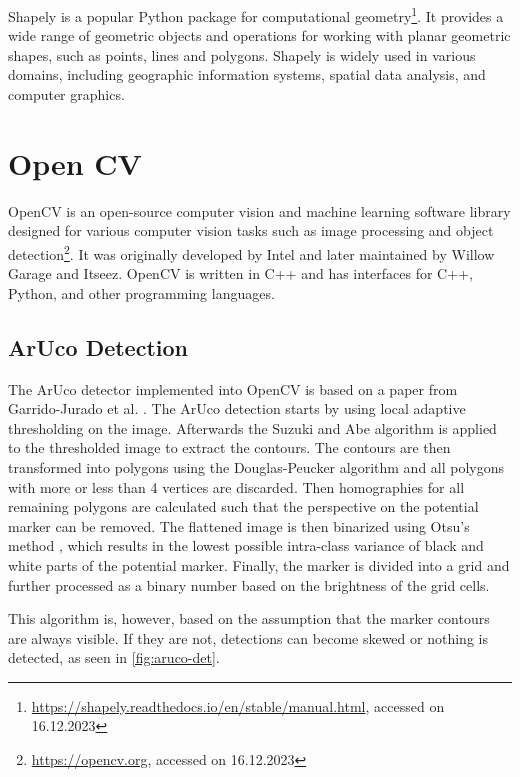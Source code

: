 \documentclass[10pt]{book}
\newcommand{\figureref}[1]{\autoref{#1}}
\begin{document}
Shapely is a popular Python package for computational geometry\footnote{\url{https://shapely.readthedocs.io/en/stable/manual.html}, accessed on 16.12.2023}. It provides a wide range of geometric objects and operations for working with planar geometric shapes, such as points, lines and polygons. Shapely is widely used in various domains, including geographic information systems, spatial data analysis, and computer graphics.

\section{Open CV}

\ac{OpenCV} is an open-source computer vision and machine learning software library designed for various computer vision tasks such as image processing and object detection\footnote{\url{https://opencv.org}, accessed on 16.12.2023}. It was originally developed by Intel and later maintained by Willow Garage and Itseez. \ac{OpenCV} is written in C++ and has interfaces for C++, Python, and other programming languages.

\subsection{ArUco Detection}
\label{sec:aruco_det}

The \ac{ArUco} detector implemented into \ac{OpenCV} is based on a paper from Garrido-Jurado et al. \cite{garrido2014automatic}. The \ac{ArUco} detection starts by using local adaptive thresholding on the image. Afterwards the Suzuki
and Abe algorithm \cite{SUZUKI198532} is applied to the thresholded image to extract the contours. The contours are then transformed into polygons using the Douglas-Peucker algorithm \cite{douglas1973algorithms} and all polygons with more or less than 4 vertices are discarded. Then homographies for all remaining polygons are calculated such that the perspective on the potential marker can be removed. The flattened image is then binarized using Otsu's method \cite{4310076}, which results in the lowest possible intra-class variance of black and white parts of the potential marker. Finally, the marker is divided into a grid and further processed as a binary number based on the brightness of the grid cells.

This algorithm is, however, based on the assumption that the marker contours are always visible. If they are not, detections can become skewed or nothing is detected, as seen in \figureref{fig:aruco-det}.
\end{document}

